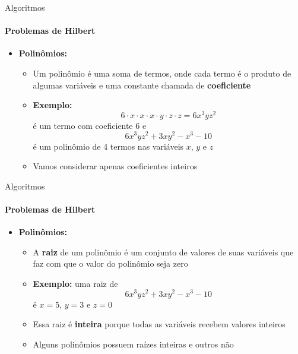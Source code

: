 \documentclass{beamer}
\begin{document}
\begin{frame}{Algoritmos}
	\framesubtitle{Problemas de Hilbert}
	\begin{itemize}
		\item \textbf{Polinômios:}
		\begin{itemize}
			\item Um polinômio é uma soma de termos, onde cada termo é o produto de algumas variáveis e uma constante chamada de \textbf{coeficiente}
			\item \textbf{Exemplo:}
			\begin{equation*}
				6 \cdot x \cdot x \cdot x \cdot y \cdot z \cdot z = 6x^{3}yz^{2}
			\end{equation*}
			é um termo com coeficiente 6 e
			\begin{equation*}
				6x^{3}yz^{2} + 3xy^{2}-x^{3}-10
			\end{equation*}
			é um polinômio de 4 termos nas variáveis $x$, $y$ e $z$
			\item Vamos considerar apenas coeficientes inteiros
		\end{itemize}
	\end{itemize}
\end{frame}
\begin{frame}{Algoritmos}
	\framesubtitle{Problemas de Hilbert}
	\begin{itemize}
		\item \textbf{Polinômios:}
		\begin{itemize}
			\item A \textbf{raiz} de um polinômio é um conjunto de valores de suas variáveis que faz com que o valor do polinômio seja zero
			\item \textbf{Exemplo:} uma raiz de
			\begin{equation*}
			6x^{3}yz^{2} + 3xy^{2}-x^{3}-10
			\end{equation*}
			é $x = 5$, $y = 3$ e $z = 0$
			\item Essa raiz é \textbf{inteira} porque todas as variáveis recebem valores inteiros
			\item Alguns polinômios possuem raízes inteiras e outros não
		\end{itemize}
	\end{itemize}
\end{frame}
\end{document}
